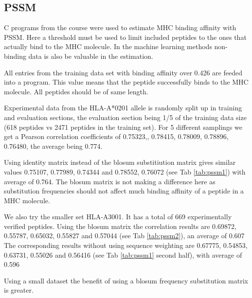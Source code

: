
\subsection*{PSSM}

C programs from the course were used to estimate MHC binding affinity with PSSM. 
Here a threshold must be used to limit included peptides to the ones that actually bind to the MHC molecule. 
In the machine learning methods non-binding data is also be valuable in the estimation.

All entries from the training data set with binding affinity over 0.426 are feeded into a program. 
This value means that the peptide successfully binds to the MHC molecule. All peptides should be of same length.

Experimental data from the HLA-A*0201 allele is randomly split up in training and evaluation sections, the evaluation section being 1/5 of the training data size (618 peptides vs 2471 peptides in the training set).
For 5 different samplings we get a Pearson correlation coefficients of {0.75323,, 0.78415, 0.78009, 0.78896, 0.76480}, the average being 0.774.

Using identity matrix instead of the blosum substitiution matrix gives similar values 0.75107, 0.77989, 0.74344 and 0.78552, 0.76072 (see Tab \ref{tab:pssm1}) with average of 0.764.
The blosum matrix is not making a difference here as substitution frequencies should not affect much binding affinity of a peptide in a MHC molecule.

We also try the smaller set HLA-A3001. It has a total of 669 experimentally verified peptides.
Using the blosum matrix the correlation results are 0.69872, 0.55787, 0.65032, 0.55827 and 0.57044 (see Tab \ref{tab:pssm2}), an average of 0.607
The corresponding results without using sequence weighting are 0.67775, 0.54853, 0.63731, 0.55026 and 0.56416 (see Tab \ref{tab:pssm1} second half), with average of 0.596

Using a small dataset the benefit of using a blosum frequency substitution matrix is greater.

